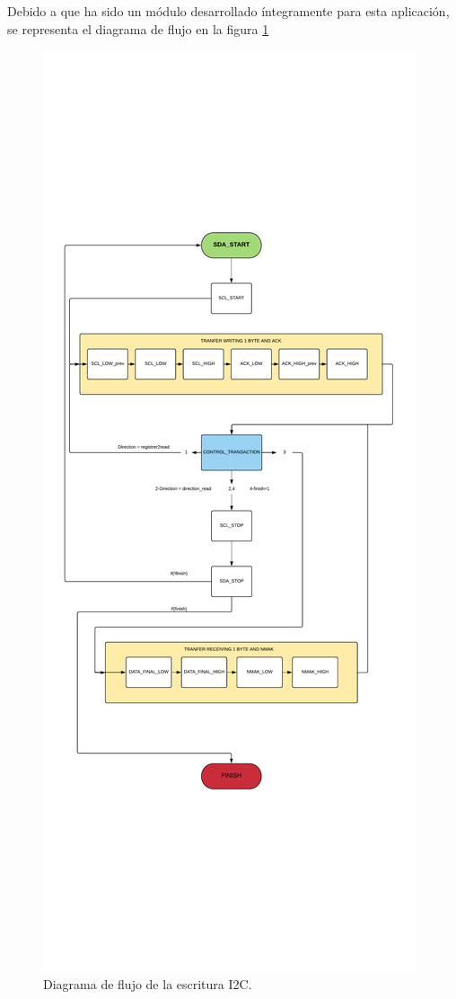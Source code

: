 Debido a que ha sido un módulo desarrollado íntegramente para esta aplicación, se representa el diagrama de flujo en la figura \ref{fig:i2c_write}

\begin{figure}[H]
	\center
	\includegraphics[trim = 0mm 6cm 0mm 6cm, clip,scale=0.5]{imagenes/Cuadricoptero_vision/I2C_WRITE.pdf}
	\caption{Diagrama de flujo de la escritura I2C.}
	\label{fig:i2c_write}
\end{figure}

